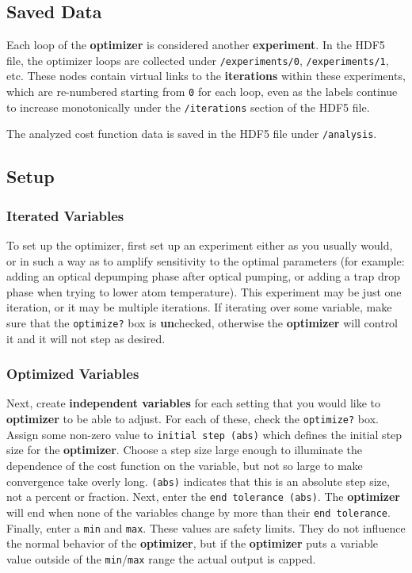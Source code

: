 \documentclass[pdftex,11pt,letterpaper]{article}
\begin{document}
\subsection{Saved Data}

Each loop of the \textbf{optimizer} is considered another \textbf{experiment}.  In the HDF5 file, the optimizer loops are collected under \texttt{/experiments/0}, \texttt{/experiments/1}, etc.  These nodes contain virtual links to the \textbf{iterations} within these experiments, which are re-numbered starting from \texttt{0} for each loop, even as the labels continue to increase monotonically under the \texttt{/iterations} section of the HDF5 file.

The analyzed cost function data is saved in the HDF5 file under \texttt{/analysis}.

\subsection{Setup}

\subsubsection{Iterated Variables}

To set up the optimizer, first set up an experiment either as you usually would, or in such a way as to amplify sensitivity to the optimal parameters (for example: adding an optical depumping phase after optical pumping, or adding a trap drop phase when trying to lower atom temperature).  This experiment may be just one iteration, or it may be multiple iterations.  If iterating over some variable, make sure that the \texttt{optimize?} box is \textbf{un}checked, otherwise the \textbf{optimizer} will control it and it will not step as desired.

\subsubsection{Optimized Variables}
Next, create \textbf{independent variables} for each setting that you would like to \textbf{optimizer} to be able to adjust.  For each of these, check the \texttt{optimize?} box.  Assign some non-zero value to \texttt{initial step (abs)} which defines the initial step size for the \textbf{optimizer}.  Choose a step size large enough to illuminate the dependence of the cost function on the variable, but not so large to make convergence take overly long.  \texttt{(abs)} indicates that this is an absolute step size, not a percent or fraction.  Next, enter the \texttt{end tolerance (abs)}.  The \textbf{optimizer} will end when none of the variables change by more than their \texttt{end tolerance}.  Finally, enter a \texttt{min} and \texttt{max}.  These values are safety limits.  They do not influence the normal behavior of the \textbf{optimizer}, but if the \textbf{optimizer} puts a variable value outside of the \texttt{min}/\texttt{max} range the actual output is capped.
\end{document}
